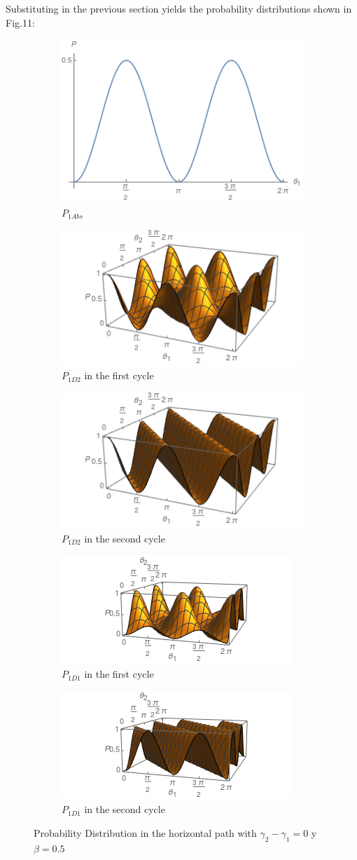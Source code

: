 \documentclass[12pt]{article}
\begin{document}
Substituting in the previous section yields the probability distributions shown in Fig.11:
\begin{figure}[h]
\centering
\begin{subfigure}[b]{0.40\linewidth}
\includegraphics[width=\linewidth,height=3 cm]{images/p1cabs.png}
\caption{$P_{1Abs}$}
\label{fig:BS1}
\end{subfigure}
\begin{subfigure}[b]{0.40\linewidth}
\includegraphics[width=\linewidth,height=3 cm]{images/p1cd21.png}
\caption{$P_{1D2}$ in the first cycle }
\label{fig:BS1}
\end{subfigure}
\begin{subfigure}[b]{0.40\linewidth}
\includegraphics[width=\linewidth,height=3 cm]{images/p1cd22.png}
\caption{$P_{1D2}$ in the second cycle}
\label{fig:BS1}
\end{subfigure}
\begin{subfigure}[b]{0.40\linewidth}
\includegraphics[width=\linewidth,height=3 cm]{images/p1cd11.png}
\caption{$P_{1D1} $ in the first cycle}
\label{fig:westminster_aerea}
\end{subfigure}
\begin{subfigure}[b]{0.40\linewidth}
\includegraphics[width=\linewidth,height=3 cm]{images/p1cd12.png}
\caption{$P_{1D1} $ in the second cycle }
\label{fig:BS1}
\end{subfigure}
\caption{Probability Distribution in the horizontal path with  $\gamma_{2}-\gamma_{1}=0 $ y $\beta=0.5$}
\label{fig:westminster}
\end{figure}
\end{document}
